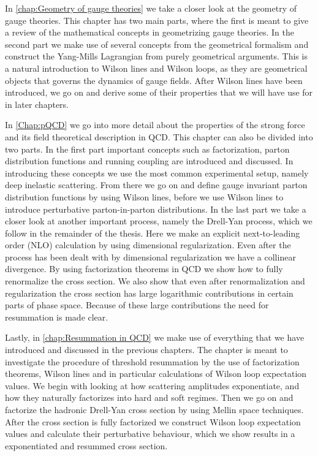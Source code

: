 In \cref{chap:Geometry of gauge theories} we take a closer look at the geometry of gauge theories. This chapter has two main parts, where the first is meant to give a review of the mathematical concepts in geometrizing gauge theories. In the second part we make use of several concepts from the geometrical formalism and construct the Yang-Mills Lagrangian from purely geometrical arguments. This is a natural introduction to Wilson lines and Wilson loops, as they are geometrical objects that governs the dynamics of gauge fields. After Wilson lines have been introduced, we go on and derive some of their properties that we will have use for in later chapters.   

In \cref{Chap:pQCD} we go into more detail about the properties of the strong force and its field theoretical description in QCD. This chapter can also be divided into two parts. In the first part important concepts such as factorization, parton distribution functions and running coupling are introduced and discussed. In introducing these concepts we use the most common experimental setup, namely deep inelastic scattering. From there we go on and define gauge invariant parton distribution functions by using Wilson lines, before we use Wilson lines to introduce perturbative parton-in-parton distributions. In the last part we take a closer look at another important process, namely the Drell-Yan process, which we follow in the remainder of the thesis. Here we make an explicit next-to-leading order (NLO) calculation by using dimensional regularization. Even after the process has been dealt with by dimensional regularization we have a collinear divergence. By using factorization theorems in QCD we show how to fully renormalize the cross section. We also show that even after renormalization and regularization the cross section has large logarithmic contributions in certain parts of phase space. Because of these large contributions the need for resummation is made clear. 

Lastly, in \cref{chap:Resummation in QCD} we make use of everything that we have introduced and discussed in the previous chapters. The chapter is meant to investigate the procedure of threshold resummation by the use of factorization theorems, Wilson lines and in particular calculations of Wilson loop expectation values. We begin with looking at how scattering amplitudes exponentiate, and how they naturally factorizes into hard and soft regimes. Then we go on and factorize the hadronic Drell-Yan cross section by using Mellin space techniques. After the cross section is fully factorized we construct Wilson loop expectation values and calculate their perturbative behaviour, which we show results in a exponentiated and resummed cross section.




